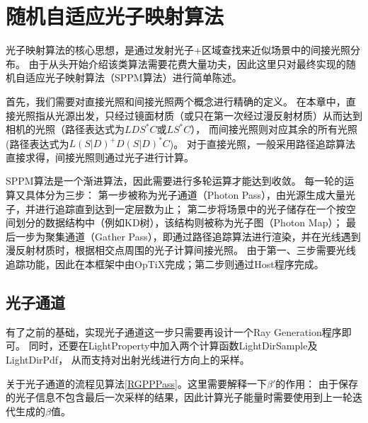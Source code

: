 \section{随机自适应光子映射算法}

光子映射算法的核心思想，是通过发射光子+区域查找来近似场景中的间接光照分布。
由于从头开始介绍该类算法需要花费大量功夫，因此这里只对最终实现的随机自适应光子映射算法（SPPM算法）进行简单陈述。

首先，我们需要对直接光照和间接光照两个概念进行精确的定义。
在本章中，直接光照指从光源出发，只经过镜面材质（或只在第一次经过漫反射材质）从而达到相机的光照（路径表达式为$LDS^*C$或$LS^*C$），
而间接光照则对应其余的所有光照(路径表达式为$L(S|D)^+D(S|D)^*C$)。
对于直接光照，一般采用路径追踪算法直接求得，间接光照则通过光子进行计算。

SPPM算法是一个渐进算法，因此需要进行多轮运算才能达到收敛。
每一轮的运算又具体分为三步：
第一步被称为光子通道（Photon Pass），由光源生成大量光子，并进行追踪直到达到一定层数为止；
第二步将场景中的光子储存在一个按空间划分的数据结构中（例如KD树），该结构则被称为光子图（Photon Map）；
最后一步为聚集通道（Gather Pass），即通过路径追踪算法进行渲染，并在光线遇到漫反射材质时，根据相交点周围的光子计算间接光照。
由于第一、三步需要光线追踪功能，因此在本框架中由OpTiX完成；第二步则通过Host程序完成。

\subsection{光子通道}

有了之前的基础，实现光子通道这一步只需要再设计一个Ray Generation程序即可。
同时，还要在LightProperty中加入两个计算函数LightDirSample及LightDirPdf，
从而支持对出射光线进行方向上的采样。

关于光子通道的流程见算法\ref{RGPPPass}。这里需要解释一下$\beta'$的作用：
由于保存的光子信息不包含最后一次采样的结果，因此计算光子能量时需要使用到上一轮迭代生成的$\beta$值。

